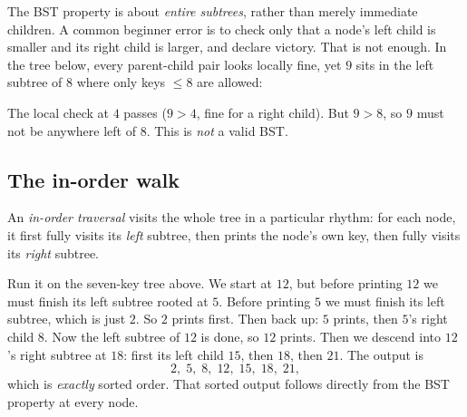 \begin{trapbox}
The BST property is about \emph{entire subtrees}, rather than merely immediate children. A common
beginner error is to check only that a node's left child is smaller and its right child is
larger, and declare victory. That is not enough. In the tree below, every parent-child pair
looks locally fine, yet $9$ sits in the left subtree of $8$ where only keys $\le 8$ are
allowed:
\begin{center}
\end{center}
The local check at $4$ passes ($9 > 4$, fine for a right child). But $9 > 8$, so $9$ must
not be anywhere left of $8$. This is \emph{not} a valid BST.
\end{trapbox}

\subsection{The in-order walk}

An \emph{in-order traversal} visits the whole tree in a particular rhythm:
for each node, it first fully visits its \emph{left} subtree, then prints the node's own
key, then fully visits its \emph{right} subtree.

\begin{algorithm}[H]
\caption{\textsc{In-Order-Walk}($x$)}
\end{algorithm}

Run it on the seven-key tree above. We start at $12$, but before printing $12$ we must
finish its left subtree rooted at $5$. Before printing $5$ we must finish its left subtree,
which is just $2$. So $2$ prints first. Then back up: $5$ prints, then $5$'s right child
$8$. Now the left subtree of $12$ is done, so $12$ prints. Then we descend into $12$'s right
subtree at $18$: first its left child $15$, then $18$, then $21$. The output is
\[
2,\;5,\;8,\;12,\;15,\;18,\;21,
\]
which is \emph{exactly} sorted order. That sorted output follows directly from the BST property
at every node.

